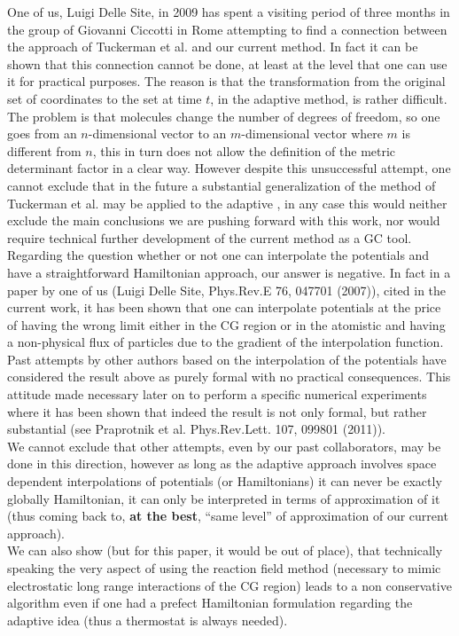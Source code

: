 \documentclass[12pt,a4paper]{article}
\begin{document}
One of us, Luigi Delle Site, in 2009 has spent a visiting period of three months in the group of Giovanni Ciccotti in Rome attempting to find a connection between the approach of
 Tuckerman et al. and our current method. In fact it can be shown that this connection cannot be done, at least at the level that one can use it for practical purposes. The reason is that the transformation from the original set of coordinates to the set at time $t$, in the adaptive method, is rather difficult. The problem is that molecules change the number of degrees of freedom, so one goes from an $n$-dimensional vector to an $m$-dimensional vector where $m$ is different from $n$, this in turn does not allow the definition of the metric determinant factor in a clear way. However despite this unsuccessful attempt, one cannot exclude that in the future a substantial generalization of the method of Tuckerman et al. may be applied to the adaptive , in any case this would neither exclude the main conclusions we are pushing forward with this work, nor would require technical further development of the current method as a GC tool.\\
Regarding the question whether or not one can interpolate the potentials and have a straightforward Hamiltonian approach, our answer is negative. In fact in a paper by one of us (Luigi Delle Site, Phys.Rev.E 76, 047701 (2007)), cited in the current work, it has been shown that one can interpolate potentials at the price of having the wrong limit either in the CG region or in the atomistic and having a non-physical flux of particles due to the gradient of the interpolation function. Past attempts by other authors based on the interpolation of the potentials have considered the result above as purely formal with no practical consequences. This attitude made necessary later on to perform a specific numerical experiments where it has been shown that indeed the result is not only formal, but rather substantial (see Praprotnik et al. Phys.Rev.Lett. 107, 099801 (2011)).\\
We cannot exclude that other attempts, even by our past collaborators, may be done in this direction, however as long as the adaptive approach involves space dependent interpolations of potentials (or Hamiltonians) it can never be exactly globally Hamiltonian, it can only be interpreted in terms of approximation of it (thus coming back to, {\bf at the best}, ``same level'' of approximation of our current approach).\\
We can also show (but for this paper, it would be out of place), that technically speaking the very aspect of using the reaction field method (necessary to mimic electrostatic long range interactions of the CG region) leads to a non conservative algorithm even if one had a prefect Hamiltonian formulation regarding the adaptive idea (thus a thermostat is always needed).\\
\end{document}
